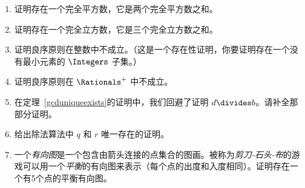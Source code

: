 \begin{enumerate}
    \item 
    证明存在一个完全平方数，它是两个完全平方数之和。
    
    
    \wbvfill
    
    \item 
    证明存在一个完全立方数，它是三个完全立方数之和。
    
    \wbvfill
    
    \workbookpagebreak
    
    \item 
    证明良序原则在整数中不成立。（这是一个存在性证明，你要证明存在一个没有最小元素的 $\Integers$ 子集。）
    
    
    \wbvfill
    
    \item 
    证明良序原则在 $\Rationals^+$ 中不成立。
    
    \wbvfill
    
    \workbookpagebreak
    
    \item 
    在定理~\ref{gcduniqueexists}的证明中，我们回避了证明 $d \divides b$。请补全那部分证明。
    
    
    \wbvfill
    
    \item 
    给出除法算法中 $q$ 和 $r$ 唯一存在的证明。
    
    \wbvfill
    
    \workbookpagebreak
    
    \item 
    一个\emph{有向图}是一个包含由箭头连接的点集合的图画。被称为\emph{剪刀-石头-布}的游戏可以用一个\emph{平衡}的有向图来表示（每个点的出度和入度相同）。证明存在一个有5个点的平衡有向图。
    \begin{center}
    
    \end{center}
      
    
    \wbvfill
    
    \workbookpagebreak
    
    \end{enumerate}